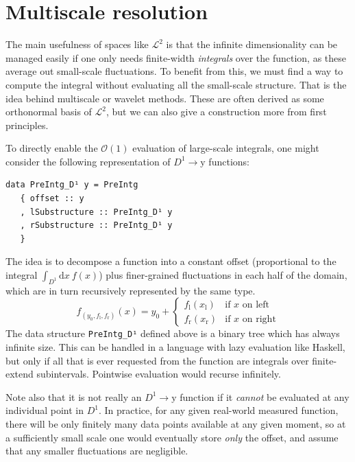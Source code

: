 \documentclass[sigplan,review,anonymous]{acmart}\settopmatter{printfolios=true,printccs=false,printacmref=false}
\theoremstyle{acmplain}
\theoremstyle{acmdefinition}
\begin{document}
\section{Multiscale resolution}\label{mulScaleResoIntro}
The main usefulness of spaces like $\mathcal{L}^2$ is that the infinite dimensionality can be managed easily if one only needs finite-width \emph{integrals} over the function, as these average out small-scale fluctuations.
To benefit from this, we must find a way to compute the integral without evaluating all the small-scale structure.
That is the idea behind multiscale or wavelet methods.
These are often derived as some orthonormal basis of $\mathcal{L}^2$, but we can also give a construction more from first principles.

To directly enable the $\mathcal{O}(1)$ evaluation of large-scale integrals, one might consider the following representation of $D^1\to \mathrm{y}$ functions:
\begin{lstlisting}
data PreIntg_D¹ y = PreIntg
   { offset :: y
   , lSubstructure :: PreIntg_D¹ y
   , rSubstructure :: PreIntg_D¹ y
   }
\end{lstlisting}
The idea is to decompose a function into a constant offset (proportional to the integral $\int_{D^1}\!\mathrm{d}x\:f(x)$) plus finer-grained fluctuations in each half of the domain, which are in turn recursively represented by the same type.
\[
  f_{(y_0,f_\mathrm{l},f_\mathrm{r})}(x)
      = y_0 + \begin{cases}
                 f_\mathrm{l}(x_\mathrm{l}) & \text{if $x$ on left}
              \\ f_\mathrm{r}(x_\mathrm{r}) & \text{if $x$ on right}
              \end{cases}
\]
The data structure \lstinline`PreIntg_D¹` defined above is a binary tree which has always infinite size.
This can be handled in a language with lazy evaluation like Haskell,
but only if all that is ever requested from the function are integrals over finite-extend subintervals.
Pointwise evaluation would recurse infinitely.

Note also that it is not really an $D^1\to \mathrm{y}$ function if it \emph{cannot} be evaluated at any individual point in $D^1$.
In practice, for any given real-world measured function, there will be only finitely many data points available at any given moment,
so at a sufficiently small scale one would eventually store \emph{only} the offset,
and assume that any smaller fluctuations are negligible.
\end{document}
